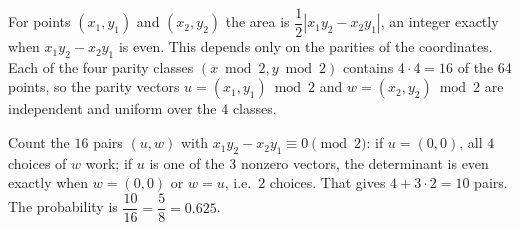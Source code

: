 For points $(x_1,y_1)$ and $(x_2,y_2)$ the area is $\dfrac{1}{2}|x_1y_2-x_2y_1|$, an integer exactly when $x_1y_2-x_2y_1$ is even. This depends only on the parities of the coordinates. Each of the four parity classes $(x\bmod2,y\bmod2)$ contains $4\cdot4=16$ of the $64$ points, so the parity vectors $u=(x_1,y_1)\bmod2$ and $w=(x_2,y_2)\bmod2$ are independent and uniform over the $4$ classes.

Count the $16$ pairs $(u,w)$ with $x_1y_2-x_2y_1\equiv0\pmod2$: if $u=(0,0)$, all $4$ choices of $w$ work; if $u$ is one of the $3$ nonzero vectors, the determinant is even exactly when $w=(0,0)$ or $w=u$, i.e.\ $2$ choices. That gives $4+3\cdot2=10$ pairs. The probability is $\dfrac{10}{16}=\dfrac{5}{8}=\boxed{0.625}$.
